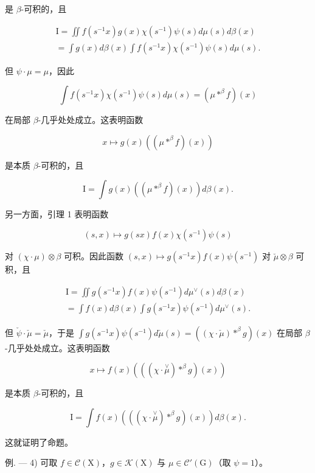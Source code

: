 是 \(\beta\)-可积的，且

\[
\begin{array}{l} \mathrm{I} = \iint f (s ^ {- 1} x) g (x) \chi (s ^ {- 1}) \psi (s) d \mu (s) d \beta (x) \\ = \int g (x) d \beta (x) \int f (s ^ {- 1} x) \chi (s ^ {- 1}) \psi (s) d \mu (s). \end{array}
\]

但 \(\psi \cdot \mu = \mu\)，因此

\[
\int f (s ^ {- 1} x) \chi (s ^ {- 1}) \psi (s) d \mu (s) = (\mu * ^ {\beta} f) (x)
\]

在局部 \(\beta\)-几乎处处成立。这表明函数

\[
x \mapsto g (x) \left(\left(\mu * ^ {\beta} f\right) (x)\right)
\]

是本质 \(\beta\)-可积的，且

\[
\mathrm{I} = \int g (x) \left(\left(\mu * ^ {\beta} f\right) (x)\right) d \beta (x).
\]

另一方面，引理 1 表明函数

\[
(s, x) \mapsto g (s x) f (x) \chi (s ^ {- 1}) \psi (s)
\]

对 \((\chi \cdot \mu) \otimes \beta\) 可积。因此函数 \((s, x) \mapsto g(s^{-1}x)f(x)\psi(s^{-1})\) 对 \(\breve{\mu} \otimes \beta\) 可积，且

\[
\begin{array}{l} \mathrm{I} = \iint g (s ^ {- 1} x) f (x) \psi (s ^ {- 1}) d \mu^ {\vee} (s) d \beta (x) \\ = \int f (x) d \beta (x) \int g (s ^ {- 1} x) \psi (s ^ {- 1}) d \mu^ {\vee} (s). \end{array}
\]

但 \(\check{\psi} \cdot \check{\mu} = \check{\mu}\)，于是 \(\int g(s^{-1}x)\psi(s^{-1})d\check{\mu}(s) = ((\chi \cdot \check{\mu}) *^{\beta}g)(x)\) 在局部 \(\beta\)-几乎处处成立。这表明函数

\[
x \mapsto f (x) \left(\left((\chi \cdot \stackrel {\vee} {\mu}) * ^ {\beta} g\right) (x)\right)
\]

是本质 \(\beta\)-可积的，且

\[
\mathrm{I} = \int f (x) \left(\left(\left(\chi \cdot \stackrel {\vee} {\mu}\right) * ^ {\beta} g\right) (x)\right) d \beta (x).
\]

这就证明了命题。

例. --- 4) 可取 \(f \in \mathcal{C}(\mathrm{X})\)，\(g \in \mathcal{K}(\mathrm{X})\) 与 \(\mu \in \mathcal{C}'(\mathrm{G})\)（取 \(\psi = 1\)）。

